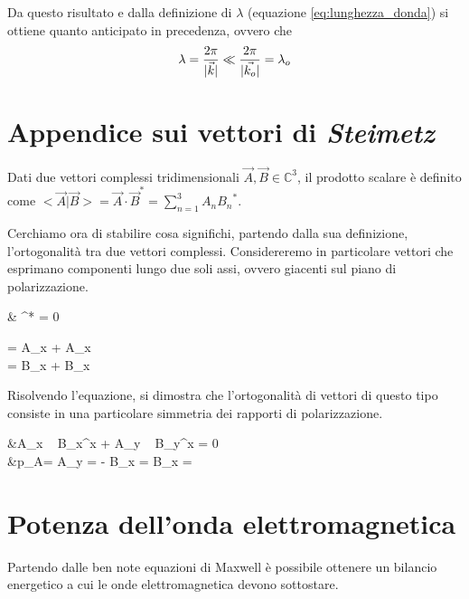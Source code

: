 		Da questo risultato e dalla definizione di $\lambda$ (equazione \ref{eq:lunghezza_donda}) si ottiene quanto anticipato in precedenza, ovvero che
		\begin{equation*} \begin{split}
			& \lambda = \frac{2\pi}{|\vec{k}|} \ll \frac{2\pi}{|\vec{k_o}|} = \lambda_o \\
		\end{split} \end{equation*}

\section{Appendice sui vettori di \emph{Steimetz}}
	Dati due vettori complessi tridimensionali $\vec{A}, \vec{B} \in \mathbb{C}^3$, il prodotto scalare è definito come $<\vec{A} | \vec{B}> = \vec{A} \cdot \vec{B}^* = \sum_{n=1}^3 A_n {B_n}^*$.

	Cerchiamo ora di stabilire cosa significhi, partendo dalla sua definizione,  l'ortogonalità tra due vettori complessi. Considereremo in particolare vettori che esprimano componenti lungo due soli assi, ovvero giacenti sul piano di polarizzazione.

	\begin{esp}
		&  \perp {} \Leftrightarrow {} \cdot {}^* = 0 \quad {}\quad \begin{dcases}
			 = A_{x\prime} \prime + A_x \prime \\
			 = B_{x\prime} \prime + B_x \prime
		\end{dcases}
	\end{esp}

	Risolvendo l'equazione, si dimostra che l'ortogonalità di vettori di questo tipo consiste in una particolare simmetria dei rapporti di polarizzazione.
	\begin{esp}
		&A_{x\prime} ~ B_{x\prime}^x + A_{y\prime} ~ B_{y\prime}^x = 0 \\
		&p_A\prime = \jmath {} { A_{y\prime} }
			= - \jmath {} { B_{x\prime} }
			=  {\jmath {} { B_{x\prime} }} = \frac{1}{-p_B^*\prime}
	\end{esp}

\section{Potenza dell'onda elettromagnetica}
	Partendo dalle ben note equazioni di Maxwell è possibile ottenere un bilancio energetico a cui le onde elettromagnetica devono sottostare.

